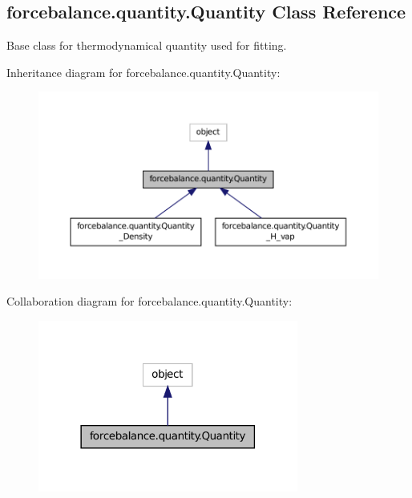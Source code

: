 \hypertarget{classforcebalance_1_1quantity_1_1Quantity}{\subsection{forcebalance.\-quantity.\-Quantity Class Reference}
\label{classforcebalance_1_1quantity_1_1Quantity}
}


Base class for thermodynamical quantity used for fitting.  




Inheritance diagram for forcebalance.\-quantity.\-Quantity\-:
\nopagebreak
\begin{figure}[H]
\begin{center}
\leavevmode
\includegraphics[width=350pt]{classforcebalance_1_1quantity_1_1Quantity__inherit__graph}
\end{center}
\end{figure}


Collaboration diagram for forcebalance.\-quantity.\-Quantity\-:
\nopagebreak
\begin{figure}[H]
\begin{center}
\leavevmode
\includegraphics[width=242pt]{classforcebalance_1_1quantity_1_1Quantity__coll__graph}
\end{center}
\end{figure}
